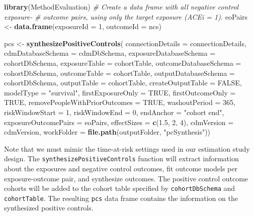 \documentclass[11pt]{book}
\newenvironment{Shaded}{\begin{snugshade}}{\end{snugshade}}
\newcommand{\CommentTok}[1]{\textcolor[rgb]{0.56,0.35,0.01}{\textit{#1}}}
\newcommand{\DataTypeTok}[1]{\textcolor[rgb]{0.13,0.29,0.53}{#1}}
\newcommand{\DecValTok}[1]{\textcolor[rgb]{0.00,0.00,0.81}{#1}}
\newcommand{\FloatTok}[1]{\textcolor[rgb]{0.00,0.00,0.81}{#1}}
\newcommand{\KeywordTok}[1]{\textcolor[rgb]{0.13,0.29,0.53}{\textbf{#1}}}
\newcommand{\NormalTok}[1]{#1}
\newcommand{\OtherTok}[1]{\textcolor[rgb]{0.56,0.35,0.01}{#1}}
\newcommand{\StringTok}[1]{\textcolor[rgb]{0.31,0.60,0.02}{#1}}
\theoremstyle{definition}
\theoremstyle{definition}
\theoremstyle{definition}
\theoremstyle{remark}
\begin{document}
\begin{Shaded}
\begin{Highlighting}[]
\KeywordTok{library}\NormalTok{(MethodEvaluation)}
\CommentTok{# Create a data frame with all negative control exposure-}
\CommentTok{# outcome pairs, using only the target exposure (ACEi = 1).}
\NormalTok{eoPairs <-}\StringTok{ }\KeywordTok{data.frame}\NormalTok{(}\DataTypeTok{exposureId =} \DecValTok{1}\NormalTok{,}
                      \DataTypeTok{outcomeId =}\NormalTok{ ncs)}

\NormalTok{pcs <-}\StringTok{ }\KeywordTok{synthesizePositiveControls}\NormalTok{(}
  \DataTypeTok{connectionDetails =}\NormalTok{ connectionDetails,}
  \DataTypeTok{cdmDatabaseSchema =}\NormalTok{ cdmDbSchema,}
  \DataTypeTok{exposureDatabaseSchema =}\NormalTok{ cohortDbSchema,}
  \DataTypeTok{exposureTable =}\NormalTok{ cohortTable,}
  \DataTypeTok{outcomeDatabaseSchema =}\NormalTok{ cohortDbSchema,}
  \DataTypeTok{outcomeTable =}\NormalTok{ cohortTable,}
  \DataTypeTok{outputDatabaseSchema =}\NormalTok{ cohortDbSchema,}
  \DataTypeTok{outputTable =}\NormalTok{ cohortTable,}
  \DataTypeTok{createOutputTable =} \OtherTok{FALSE}\NormalTok{,}
  \DataTypeTok{modelType =} \StringTok{"survival"}\NormalTok{,}
  \DataTypeTok{firstExposureOnly =} \OtherTok{TRUE}\NormalTok{,}
  \DataTypeTok{firstOutcomeOnly =} \OtherTok{TRUE}\NormalTok{,}
  \DataTypeTok{removePeopleWithPriorOutcomes =} \OtherTok{TRUE}\NormalTok{,}
  \DataTypeTok{washoutPeriod =} \DecValTok{365}\NormalTok{,}
  \DataTypeTok{riskWindowStart =} \DecValTok{1}\NormalTok{,}
  \DataTypeTok{riskWindowEnd =} \DecValTok{0}\NormalTok{,}
  \DataTypeTok{endAnchor =} \StringTok{"cohort end"}\NormalTok{,}
  \DataTypeTok{exposureOutcomePairs =}\NormalTok{ eoPairs,}
  \DataTypeTok{effectSizes =} \KeywordTok{c}\NormalTok{(}\FloatTok{1.5}\NormalTok{, }\DecValTok{2}\NormalTok{, }\DecValTok{4}\NormalTok{),}
  \DataTypeTok{cdmVersion =}\NormalTok{ cdmVersion,}
  \DataTypeTok{workFolder =} \KeywordTok{file.path}\NormalTok{(outputFolder,}
                         \StringTok{"pcSynthesis"}\NormalTok{))}
\end{Highlighting}
\end{Shaded}

Note that we must mimic the time-at-risk settings used in our estimation study design. The \texttt{synthesizePositiveControls} function will extract information about the exposures and negative control outcomes, fit outcome models per exposure-outcome pair, and synthesize outcomes. The positive control outcome cohorts will be added to the cohort table specified by \texttt{cohortDbSchema} and \texttt{cohortTable}. The resulting \texttt{pcs} data frame contains the information on the synthesized positive controls.
\end{document}
